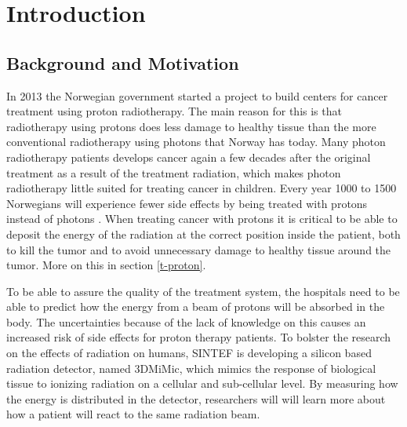 \documentclass[../main/thesis.tex]{subfiles}
\begin{document}
\newpage

\chapter{Introduction}
\label{intro}
\section{Background and Motivation}
\label{i-background}
In 2013 the Norwegian government started a project to build centers for cancer treatment using proton radiotherapy. The main reason for this is that radiotherapy using protons does less damage to healthy tissue than the more conventional radiotherapy using photons that Norway has today. Many photon radiotherapy patients develops cancer again a few decades after the original treatment as a result of the treatment radiation, which makes photon radiotherapy little suited for treating cancer in children. Every year 1000 to 1500 Norwegians will experience fewer side effects by being treated with protons instead of photons \citep{uio2012}. When treating cancer with protons it is critical to be able to deposit the energy of the radiation at the correct position inside the patient, both to kill the tumor and to avoid unnecessary damage to healthy tissue around the tumor. More on this in section \ref{t-proton}.


To be able to assure the quality of the treatment system, the hospitals need to be able to predict how the energy from a beam of protons will be absorbed in the body. The uncertainties because of the lack of knowledge on this causes an increased risk of side effects for proton therapy patients. To bolster the research on the effects of radiation on humans, SINTEF is developing a silicon based radiation detector, named 3DMiMic, which mimics the response of biological tissue to ionizing radiation on a cellular and sub-cellular level. By measuring how the energy is distributed in the detector, researchers will will learn more about how a patient will react to the same radiation beam. \citep{sintef3dmimic}
\end{document}

